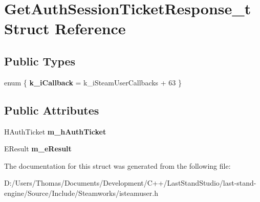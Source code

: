 \hypertarget{structGetAuthSessionTicketResponse__t}{}\section{Get\+Auth\+Session\+Ticket\+Response\+\_\+t Struct Reference}
\label{structGetAuthSessionTicketResponse__t}
\subsection*{Public Types}
\begin{DoxyCompactItemize}
\item 
\hypertarget{structGetAuthSessionTicketResponse__t_a8247fbcf3449fe79eed52849fe1d16c9}{}enum \{ {\bfseries k\+\_\+i\+Callback} = k\+\_\+i\+Steam\+User\+Callbacks + 63
 \}\label{structGetAuthSessionTicketResponse__t_a8247fbcf3449fe79eed52849fe1d16c9}

\end{DoxyCompactItemize}
\subsection*{Public Attributes}
\begin{DoxyCompactItemize}
\item 
\hypertarget{structGetAuthSessionTicketResponse__t_acdb83244467842eabc2b6e540dcbaa64}{}H\+Auth\+Ticket {\bfseries m\+\_\+h\+Auth\+Ticket}\label{structGetAuthSessionTicketResponse__t_acdb83244467842eabc2b6e540dcbaa64}

\item 
\hypertarget{structGetAuthSessionTicketResponse__t_a7a87eea494881b548c3b46847f3896e0}{}E\+Result {\bfseries m\+\_\+e\+Result}\label{structGetAuthSessionTicketResponse__t_a7a87eea494881b548c3b46847f3896e0}

\end{DoxyCompactItemize}


The documentation for this struct was generated from the following file\+:\begin{DoxyCompactItemize}
\item 
D\+:/\+Users/\+Thomas/\+Documents/\+Development/\+C++/\+Last\+Stand\+Studio/last-\/stand-\/engine/\+Source/\+Include/\+Steamworks/isteamuser.\+h\end{DoxyCompactItemize}
